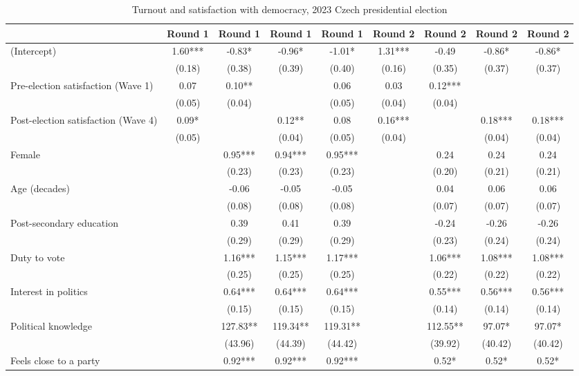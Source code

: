 \begin{table}

\caption{\label{tab:unnamed-chunk-2}Turnout and satisfaction with democracy, 2023 Czech presidential election}
\centering
\begin{tabular}[t]{lcccccccc}
\toprule
  & Round 1 & Round 1  & Round 1   & Round 1    & Round 2 & Round 2  & Round 2   & Round 2   \\
\midrule
(Intercept) & 1.60*** & -0.83* & -0.96* & -1.01* & 1.31*** & -0.49 & -0.86* & -0.86*\\
 & (0.18) & (0.38) & (0.39) & (0.40) & (0.16) & (0.35) & (0.37) & (0.37)\\
Pre-election satisfaction (Wave 1) & 0.07 & 0.10** &  & 0.06 & 0.03 & 0.12*** &  & \\
 & (0.05) & (0.04) &  & (0.05) & (0.04) & (0.04) &  & \\
Post-election satisfaction (Wave 4) & 0.09* &  & 0.12** & 0.08 & 0.16*** &  & 0.18*** & 0.18***\\
 & (0.05) &  & (0.04) & (0.05) & (0.04) &  & (0.04) & (0.04)\\
Female &  & 0.95*** & 0.94*** & 0.95*** &  & 0.24 & 0.24 & 0.24\\
 &  & (0.23) & (0.23) & (0.23) &  & (0.20) & (0.21) & (0.21)\\
Age (decades) &  & -0.06 & -0.05 & -0.05 &  & 0.04 & 0.06 & 0.06\\
 &  & (0.08) & (0.08) & (0.08) &  & (0.07) & (0.07) & (0.07)\\
Post-secondary education &  & 0.39 & 0.41 & 0.39 &  & -0.24 & -0.26 & -0.26\\
 &  & (0.29) & (0.29) & (0.29) &  & (0.23) & (0.24) & (0.24)\\
Duty to vote &  & 1.16*** & 1.15*** & 1.17*** &  & 1.06*** & 1.08*** & 1.08***\\
 &  & (0.25) & (0.25) & (0.25) &  & (0.22) & (0.22) & (0.22)\\
Interest in politics &  & 0.64*** & 0.64*** & 0.64*** &  & 0.55*** & 0.56*** & 0.56***\\
 &  & (0.15) & (0.15) & (0.15) &  & (0.14) & (0.14) & (0.14)\\
Political knowledge &  & 127.83** & 119.34** & 119.31** &  & 112.55** & 97.07* & 97.07*\\
 &  & (43.96) & (44.39) & (44.42) &  & (39.92) & (40.42) & (40.42)\\
Feels close to a party &  & 0.92*** & 0.92*** & 0.92*** &  & 0.52* & 0.52* & 0.52*\\

\end{tabular}
\end{table}
